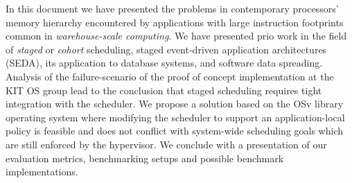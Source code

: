 \documentclass{article}
\begin{document}
In this document we have presented the problems in contemporary processors' memory hierarchy encountered by applications
with large instruction footprints common in \textit{warehouse-scale computing}.
We have presented prio work in the field of
\emph{staged} or \emph{cohort} scheduling,
staged event-driven application architectures (SEDA),
its application to database systems,
and software data spreading.
Analysis of the failure-scenario of the proof of concept implementation at the KIT OS group lead to the conclusion that
staged scheduling requires tight integration with the scheduler.
We propose a solution based on the OSv library operating system where modifying the scheduler to support an
application-local policy is feasible and does not conflict with system-wide scheduling goals which are still enforced by
the hypervisor.
We conclude with a presentation of our evaluation metrics, benchmarking setups and possible benchmark implementations.

\clearpage

\printbibliography
\end{document}
